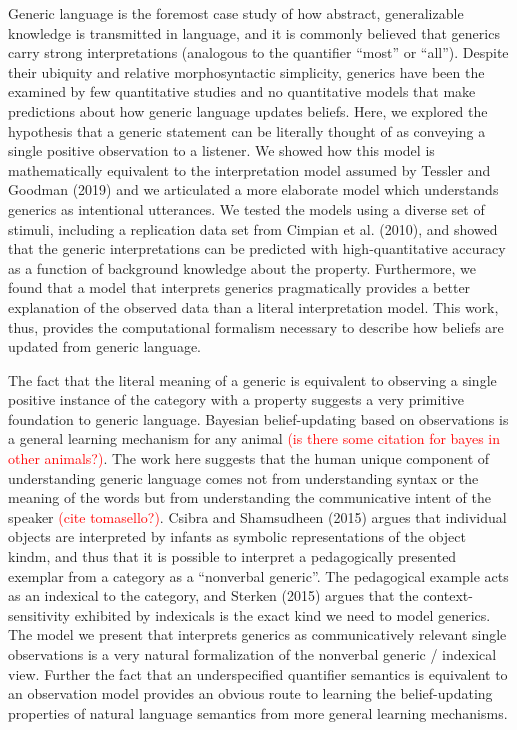 \documentclass[floatsintext,doc]{apa6}
\begin{document}
Generic language is the foremost case study of how abstract, generalizable knowledge is transmitted in language, and it is commonly believed that generics carry strong interpretations (analogous to the quantifier \enquote{most} or \enquote{all}).
Despite their ubiquity and relative morphosyntactic simplicity, generics have been the examined by few quantitative studies and no quantitative models that make predictions about how generic language updates beliefs.
Here, we explored the hypothesis that a generic statement can be literally thought of as conveying a single positive observation to a listener.
We showed how this model is mathematically equivalent to the interpretation model assumed by Tessler and Goodman (2019) and we articulated a more elaborate model which understands generics as intentional utterances.
We tested the models using a diverse set of stimuli, including a replication data set from Cimpian et al. (2010), and showed that the generic interpretations can be predicted with high-quantitative accuracy as a function of background knowledge about the property.
Furthermore, we found that a model that interprets generics pragmatically provides a better explanation of the observed data than a literal interpretation model.
This work, thus, provides the computational formalism necessary to describe how beliefs are updated from generic language.

The fact that the literal meaning of a generic is equivalent to observing a single positive instance of the category with a property suggests a very primitive foundation to generic language.
Bayesian belief-updating based on observations is a general learning mechanism for any animal {\textcolor{Red}{(is there some citation for bayes in other animals?)}}.
The work here suggests that the human unique component of understanding generic language comes not from understanding
syntax or the meaning of the words but from understanding the communicative intent of the speaker {\textcolor{Red}{(cite tomasello?)}}.
Csibra and Shamsudheen (2015) argues that individual objects are interpreted by infants as symbolic representations of the object kindm, and thus that it is possible to interpret a pedagogically presented exemplar from a category as a \enquote{nonverbal generic}.
The pedagogical example acts as an indexical to the category, and Sterken (2015) argues that the context-sensitivity exhibited by indexicals is the exact kind we need to model generics.
The model we present that interprets generics as communicatively relevant single observations is a very natural formalization of the nonverbal generic / indexical view.
Further the fact that an underspecified quantifier semantics is equivalent to an observation model provides an obvious route to learning the belief-updating properties of natural language semantics from more general learning mechanisms.
\end{document}
